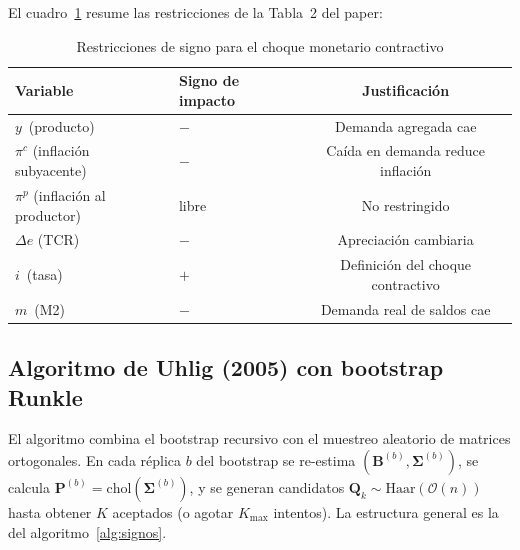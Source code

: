\documentclass[11pt,letterpaper]{article}
\begin{document}
El cuadro~\ref{tab:signos} resume las restricciones de la Tabla~2 del paper:

\begin{table}[H]
\centering
\caption{Restricciones de signo para el choque monetario contractivo}
\label{tab:signos}
\small
\begin{tabular}{@{}llc@{}}
\toprule
\textbf{Variable} & \textbf{Signo de impacto} & \textbf{Justificación} \\
\midrule
$y$ \;\;\,(producto)              & $-$    & Demanda agregada cae \\
$\pi^c$ (inflación subyacente)    & $-$    & Caída en demanda reduce inflación \\
$\pi^p$ (inflación al productor)  & libre  & No restringido \\
$\Delta e$ (TCR)                  & $-$    & Apreciación cambiaria \\
$i$ \;\;\,(tasa)                  & $+$    & Definición del choque contractivo \\
$m$ \;\;\,(M2)                    & $-$    & Demanda real de saldos cae \\
\bottomrule
\end{tabular}
\end{table}

\subsection{Algoritmo de Uhlig (2005) con bootstrap Runkle}

El algoritmo combina el bootstrap recursivo con el muestreo aleatorio de matrices ortogonales. En cada réplica $b$ del bootstrap se re-estima $(\bm{B}^{(b)}, \bm{\Sigma}^{(b)})$, se calcula $\bm{P}^{(b)} = \mathrm{chol}(\bm{\Sigma}^{(b)})$, y se generan candidatos $\bm{Q}_k \sim \mathrm{Haar}(\mathcal{O}(n))$ hasta obtener $K$ aceptados (o agotar $K_{\max}$ intentos). La estructura general es la del algoritmo~\ref{alg:signos}.
\end{document}
